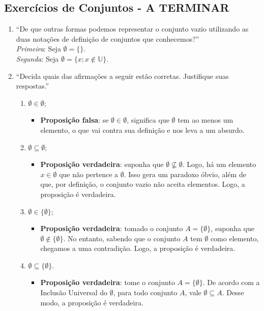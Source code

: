 \documentclass{article}
\begin{document}
\subsection{Exercícios de Conjuntos - A TERMINAR} 
\begin{enumerate}
    \item 
        \enquote{De que outras formas podemos representar o conjunto vazio utilizando as duas notações de definição de conjuntos que conhecemos?}
        \\
        \emph{Primeira}: Seja $\emptyset = \{\}$. \\
        \emph{Segunda}: Seja $\emptyset = \{x; x \notin \mathbb{U} \}$.
    \item \enquote{Decida quais das afirmações a seguir estão corretas. Justifique suas respostas.}
    \begin{enumerate}
        \item $\emptyset \in \emptyset$;
        \begin{itemize}
            \item \textbf{Proposição falsa}: se $\emptyset \in \emptyset$, significa que $\emptyset$ tem ao menos um elemento, o que vai contra sua definição e nos leva a um absurdo.
        \end{itemize}
        \item $\emptyset \subseteq \emptyset$;
        \begin{itemize}
            \item \textbf{Proposição verdadeira}: suponha que $\emptyset \nsubseteq \emptyset$. Logo, há um elemento $x \in \emptyset$ que não pertence a $\emptyset$. Isso gera um paradoxo óbvio, além de que, por definição, o conjunto vazio não aceita elementos. Logo, a proposição é verdadeira.
        \end{itemize}
        \item $\emptyset \in \{\emptyset\}$;
        \begin{itemize}
            \item \textbf{Proposição verdadeira}: tomado o conjunto $A = \{\emptyset\}$, suponha que $\emptyset \notin \{\emptyset\}$. No entanto, sabendo que o conjunto $A$ tem $\emptyset$ como elemento, chegamos a uma contradição. Logo, a proposição é verdadeira.
        \end{itemize}
        \item $\emptyset \subseteq \{\emptyset\}$.
        \begin{itemize}
            \item \textbf{Proposição verdadeira}: tome o conjunto $A = \{\emptyset\}$. De acordo com a Inclusão Universal do $\emptyset$, para todo conjunto $A$, vale $\emptyset \subseteq A$. Desse modo, a proposição é verdadeira.

\end{itemize}
\end{enumerate}
\end{enumerate}
\end{document}
